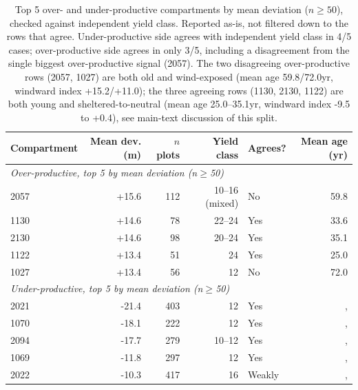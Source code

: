 \documentclass[logo,msc,ai]{infthesis}           %
\begin{document}
\begin{table}[H]
\centering
\small
\begin{tabular}{lrrrlr}
\toprule
Compartment & Mean dev. (m) & $n$ plots & Yield class & Agrees? & Mean age (yr) \\
\midrule
\multicolumn{6}{l}{\textit{Over-productive, top 5 by mean deviation (n$\geq$50)}} \\
2057 & +15.6 & 112 & 10--16 (mixed) & No & 59.8 \\
1130 & +14.6 & 78 & 22--24 & Yes & 33.6 \\
2130 & +14.6 & 98 & 20--24 & Yes & 35.1 \\
1122 & +13.4 & 51 & 24 & Yes & 25.0 \\
1027 & +13.4 & 56 & 12 & No & 72.0 \\
\midrule
\multicolumn{6}{l}{\textit{Under-productive, top 5 by mean deviation (n$\geq$50)}} \\
2021 & -21.4 & 403 & 12 & Yes &, \\
1070 & -18.1 & 222 & 12 & Yes &, \\
2094 & -17.7 & 279 & 10--12 & Yes &, \\
1069 & -11.8 & 297 & 12 & Yes &, \\
2022 & -10.3 & 417 & 16 & Weakly &, \\
\bottomrule
\end{tabular}
\caption{\small{Top 5 over- and under-productive compartments by mean deviation
($n\geq50$), checked against independent yield class. Reported as-is, not filtered down to the
rows that agree. Under-productive side agrees with independent yield class in 4/5 cases;
over-productive side agrees in only 3/5, including a disagreement from the single biggest
over-productive signal (2057). The two disagreeing over-productive rows (2057, 1027) are both
old and wind-exposed (mean age 59.8/72.0yr, windward index +15.2/+11.0); the three agreeing
rows (1130, 2130, 1122) are both young and sheltered-to-neutral (mean age 25.0--35.1yr,
windward index -9.5 to +0.4), see main-text discussion of this split.}}
\label{tab:productivity-top5}
\end{table}
\end{document}
